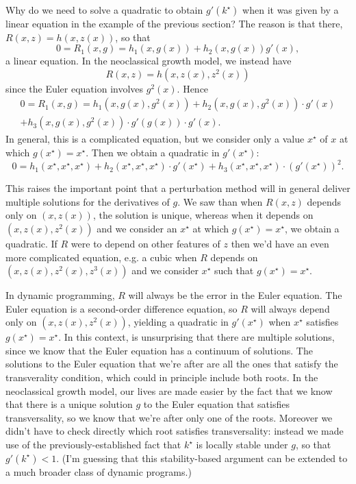 \documentclass[11pt,letterpaper,reqno,oneside]{article}
\begin{document}
Why do we need to solve a quadratic to obtain $g'(k^\star)$ when it was given by a linear equation in the example of the previous section? The reason is that there, $R(x,z) = h(x,z(x))$, so that
%
\begin{equation*}
	0 = R_1(x,g) = h_1(x,g(x)) + h_2(x,g(x)) g'(x) ,
\end{equation*}
%
a linear equation. In the neoclassical growth model, we instead have
%
\begin{equation*}
	R(x,z) = h\left( x, z(x), z^2(x)  \right)
\end{equation*}
%
since the Euler equation involves $g^2(x)$. Hence
%
\begin{multline*}
	0 = R_1(x,g) = h_1\left(x,g(x),g^2(x)\right) 
	+ h_2\left(x,g(x),g^2(x)\right) \cdot g'(x) 
	\\+ h_3\left(x,g(x),g^2(x)\right) \cdot g'(g(x)) \cdot g'(x) .
\end{multline*}
%
In general, this is a complicated equation, but we consider only a value $x^\star$ of $x$ at which $g(x^\star) = x^\star$. Then we obtain a quadratic in $g'(x^\star)$:
%
\begin{equation*}
	0 = h_1(x^\star,x^\star,x^\star) + h_2(x^\star,x^\star,x^\star) \cdot g'(x^\star) 
	+ h_3(x^\star,x^\star,x^\star) \cdot (g'(x^\star))^2 .
\end{equation*}


This raises the important point that a perturbation method will in general deliver multiple solutions for the derivatives of $g$. We saw than when $R(x,z)$ depends only on $(x,z(x))$, the solution is unique, whereas when it depends on $\left(x,z(x),z^2(x)\right)$ and we consider an $x^\star$ at which $g(x^\star)=x^\star$, we obtain a quadratic. If $R$ were to depend on other features of $z$ then we'd have an even more complicated equation, e.g. a cubic when $R$ depends on $\left(x,z(x),z^2(x),z^3(x)\right)$ and we consider $x^\star$ such that $g\left(x^\star\right) = x^\star$.

In dynamic programming, $R$ will always be the error in the Euler equation. The Euler equation is a second-order difference equation, so $R$ will always depend only on $\left(x,z(x),z^2(x)\right)$, yielding a quadratic in $g'(x^\star)$ when $x^\star$ satisfies $g\left(x^\star\right) = x^\star$. In this context, is unsurprising that there are multiple solutions, since we know that the Euler equation has a continuum of solutions. The solutions to the Euler equation that we're after are all the ones that satisfy the transverality condition, which could in principle include both roots. In the neoclassical growth model, our lives are made easier by the fact that we know that there is a unique solution $g$ to the Euler equation that satisfies transversality, so we know that we're after only one of the roots. Moreover we didn't have to check directly which root satisfies transversality: instead we made use of the previously-established fact that $k^\star$ is locally stable under $g$, so that $g'(k^\star)<1$. (I'm guessing that this stability-based argument can be extended to a much broader class of dynamic programs.)
\end{document}

